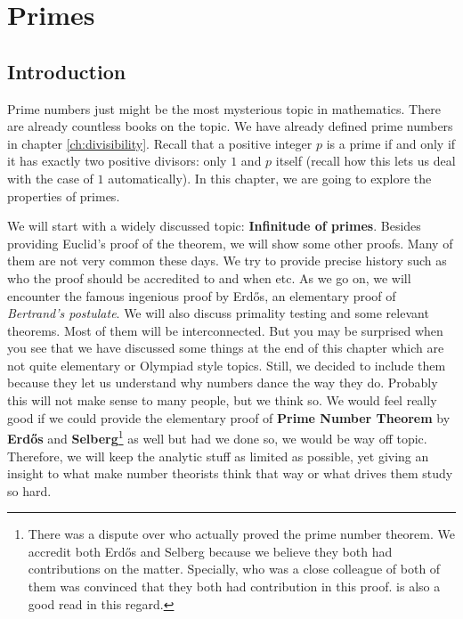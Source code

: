 \documentclass{subfiles}
\begin{document}
\chapter{Primes}\label{ch:primes}

\section{Introduction}
	Prime numbers just might be the most mysterious topic in mathematics. There are already countless books on the topic. We have already defined prime numbers in chapter \eqref{ch:divisibility}. Recall that a positive integer $p$ is a prime if and only if it has exactly two positive divisors: only $1$ and $p$ itself (recall how this lets us deal with the case of $1$ automatically). In this chapter, we are going to explore the properties of primes\watermark.

	We will start with a widely discussed topic: \textbf{Infinitude of primes}. Besides providing Euclid's proof of the theorem, we will show some other proofs. Many of them are not very common these days. We try to provide precise history such as who the proof should be accredited to and when etc. As we go on, we will encounter the famous ingenious proof by Erd\H{o}s, an elementary proof of \textit{Bertrand's postulate}. We will also discuss primality testing and some relevant theorems. Most of them will be interconnected. But you may be surprised when you see that we have discussed some things at the end of this chapter which are not quite elementary or Olympiad style topics. Still, we decided to include them because they let us understand why numbers dance the way they do. Probably this will not make sense to many people, but we think so. We would feel really good if we could provide the elementary proof of \textbf{Prime Number Theorem} by \textbf{Erd\H{o}s} and \textbf{Selberg}\footnote{There was a dispute over who actually proved the prime number theorem. We accredit both Erd\H{o}s and Selberg because we believe they both had contributions on the matter. Specially, \textcite{goldfeld_2004} who was a close colleague of both of them was convinced that they both had contribution in this proof. \textcite{baas_skau_2008} is also a good read in this regard.} as well but had we done so, we would be way off topic. Therefore, we will keep the analytic stuff as limited as possible, yet giving an insight to what make number theorists think that way or what drives them study so hard.
\end{document}
